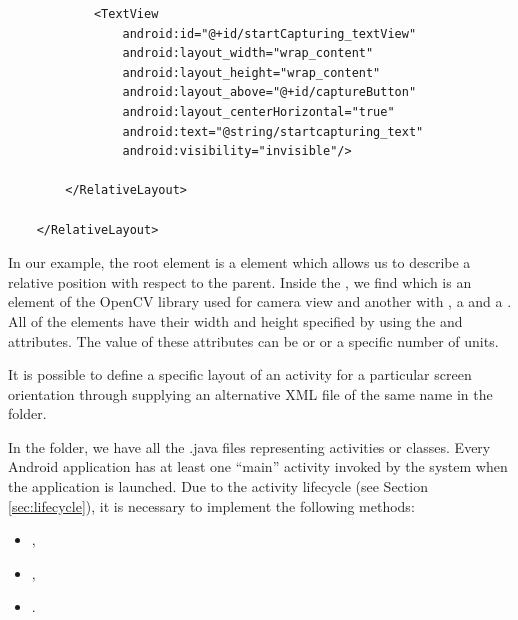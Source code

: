 \begin{lstlisting}
    	    <TextView
    	        android:id="@+id/startCapturing_textView"
    	        android:layout_width="wrap_content"
    	        android:layout_height="wrap_content"
    	        android:layout_above="@+id/captureButton"
    	        android:layout_centerHorizontal="true"
    	        android:text="@string/startcapturing_text"
    	        android:visibility="invisible"/>
    
    	</RelativeLayout>
    	
    </RelativeLayout>
\end{lstlisting}

In our example, the root element is a  element which allows us to describe a relative position with respect to the parent. 
Inside the , we find  which is an element of the OpenCV library used for camera view and another  with , a  and a .
All of the elements have their width and height specified by using the  and  attributes.
The value of these attributes can be  or  or a specific number of units.

It is possible to define a specific layout of an activity for a particular screen orientation through supplying an alternative XML file of the same name in the  folder.

In the  folder, we have all the .java files representing activities or classes.
Every Android application has at least one ``main'' activity invoked by the system when the application is launched.
Due to the activity lifecycle (see Section \ref{sec:lifecycle}), it is necessary to implement the following methods:
\begin{itemize}
\item {},
\item {},
\item {}.
\end{itemize}

